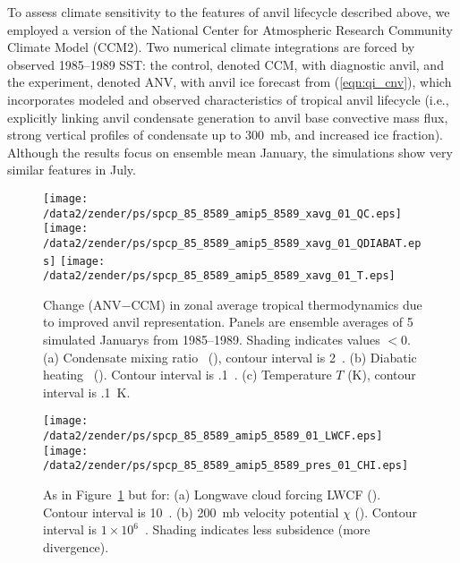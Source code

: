 \documentclass[twocolumn,twoside,final,10pt]{article}
\begin{document}
\label{sec:dsc}

To assess climate sensitivity to the features of anvil lifecycle
described above, we employed a version of the National Center for
Atmospheric Research Community Climate Model (CCM2). 
Two numerical climate integrations are forced by observed 1985--1989
SST: the control, denoted CCM, with diagnostic anvil, and the 
experiment, denoted ANV, with anvil ice forecast from
(\ref{eqn:qi_cnv}), which incorporates modeled and observed
characteristics of tropical anvil lifecycle (i.e., explicitly linking
anvil condensate generation to anvil base convective mass flux,
strong vertical profiles of condensate up to 300~mb, and increased ice
fraction).
Although the results focus on ensemble mean January, the simulations
show very similar features in July.

\begin{figure}
\begin{center}
\texttt{[image: /data2/zender/ps/spcp\_85\_8589\_amip5\_8589\_xavg\_01\_QC.eps]}\vfill
\texttt{[image: /data2/zender/ps/spcp\_85\_8589\_amip5\_8589\_xavg\_01\_QDIABAT.eps]}\vfill
\texttt{[image: /data2/zender/ps/spcp\_85\_8589\_amip5\_8589\_xavg\_01\_T.eps]}\vfill
\end{center}
\caption{
Change (ANV$-$CCM) in zonal average tropical thermodynamics due to
improved anvil representation.
Panels are ensemble averages of 5 simulated Januarys from 1985--1989.
Shading indicates values $< 0$.
(a) Condensate mixing ratio \qc\ (\mgxkg), contour interval is
2~\mgxkg.
(b) Diabatic heating \QT\ (\kxday). Contour interval is .1~\kxday.  
(c) Temperature $T$ (\degreee K), contour interval is .1~\degreee K.
\label{fig:xavg_8589}}   
\end{figure}

\begin{figure}
\begin{center}
\texttt{[image: /data2/zender/ps/spcp\_85\_8589\_amip5\_8589\_01\_LWCF.eps]}\vfill
\texttt{[image: /data2/zender/ps/spcp\_85\_8589\_amip5\_8589\_pres\_01\_CHI.eps]}\vfill
\end{center}
\caption{
As in Figure~\ref{fig:xavg_8589} but for:
(a) Longwave cloud forcing LWCF (\wxmS). Contour interval is 10~\wxmS.
(b) 200~mb velocity potential $\chi$ (\mSxs). Contour interval is $1
\times 10^6$~\mSxs.  Shading indicates less subsidence (more
divergence). 
\label{fig:8589}}   
\end{figure}
\end{document}
